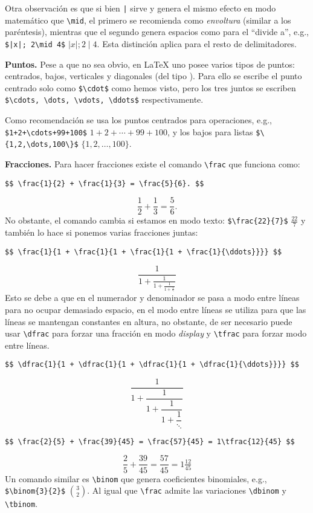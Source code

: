 Otra observación es que si bien \lstinline!|! sirve y genera el mismo efecto en modo matemático que \lstinline|\mid|, el primero se recomienda como \textit{envoltura} (similar a los paréntesis), mientras que el segundo genera espacios como para el ``divide a'', e.g., \lstinline!$|x|; 2\mid 4$! $|x|; 2\mid 4$.
Esta distinción aplica para el resto de delimitadores.

\textbf{Puntos.} Pese a que no sea obvio, en \LaTeX{} uno posee varios tipos de puntos: centrados, bajos, verticales y diagonales (del tipo \smash{$\ddots$}). Para ello se escribe el punto centrado solo como \lstinline|$\cdot$| como hemos visto, pero los tres juntos se escriben \lstinline|$\cdots, \dots, \vdots, \ddots$| \smash{$\cdots, \dots, \vdots, \ddots$} respectivamente.

Como recomendación se usa los puntos centrados para operaciones, e.g., \lstinline|$1+2+\cdots+99+100$| $1+2+\cdots+99+100$, y los bajos para listas \lstinline|$\{1,2,\dots,100\}$| $\{1,2,\dots,100\}$.

\textbf{Fracciones.} Para hacer fracciones existe el comando \lstinline|\frac| que funciona como:
\begin{lstlisting}
$$ \frac{1}{2} + \frac{1}{3} = \frac{5}{6}. $$
\end{lstlisting}
$$ \frac{1}{2} + \frac{1}{3} = \frac{5}{6}. $$
No obstante, el comando cambia si estamos en modo texto: \lstinline|$\frac{22}{7}$| $\frac{22}{7}$ y también lo hace si ponemos varias fracciones juntas:
\begin{lstlisting}[basicstyle=\scriptsize\ttfamily]
$$ \frac{1}{1 + \frac{1}{1 + \frac{1}{1 + \frac{1}{\ddots}}}} $$
\end{lstlisting}
$$ \frac{1}{1 + \frac{1}{1 + \frac{1}{1 + \frac{1}{\ddots}}}} $$
Esto se debe a que en el numerador y denominador se pasa a modo entre líneas para no ocupar demasiado espacio, en el modo entre líneas se utiliza para que las líneas se mantengan constantes en altura, no obstante, de ser necesario puede usar \lstinline|\dfrac| para forzar una fracción en modo \textit{display} y \lstinline|\tfrac| para forzar modo entre líneas.
\begin{lstlisting}[basicstyle=\scriptsize\ttfamily]
$$ \dfrac{1}{1 + \dfrac{1}{1 + \dfrac{1}{1 + \dfrac{1}{\ddots}}}} $$
\end{lstlisting}
$$ \dfrac{1}{1 + \dfrac{1}{1 + \dfrac{1}{1 + \dfrac{1}{\ddots}}}} $$
\begin{lstlisting}[basicstyle=\scriptsize\ttfamily]
$$ \frac{2}{5} + \frac{39}{45} = \frac{57}{45} = 1\tfrac{12}{45} $$
\end{lstlisting}
$$ \frac{2}{5} + \frac{39}{45} = \frac{57}{45} = 1\tfrac{12}{45} $$
Un comando similar es \lstinline|\binom| que genera coeficientes binomiales, e.g.,\break
\lstinline|$\binom{3}{2}$| $\binom{3}{2}$.
Al igual que \lstinline|\frac| admite las variaciones \lstinline|\dbinom| y \lstinline|\tbinom|.

